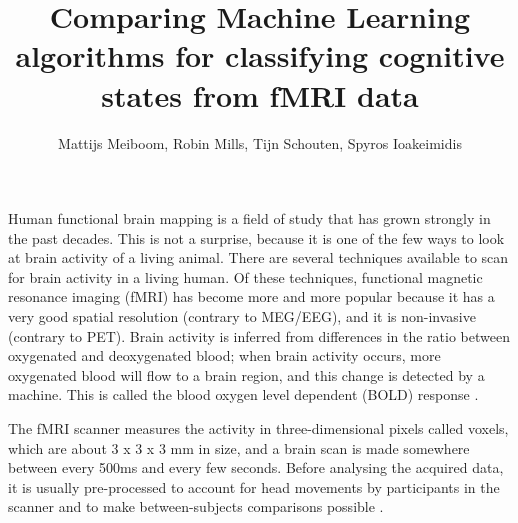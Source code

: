 \documentclass[preprint,journal,11pt]{vgtc}
\title{Comparing Machine Learning algorithms for classifying cognitive states from fMRI data}
\author{Mattijs Meiboom, Robin Mills, Tijn Schouten, Spyros Ioakeimidis}
\begin{document}
\label{sec:introduction}
\maketitle
Human functional brain mapping is a field of study that has grown strongly in the past decades. This is not a surprise, because it is one of the few ways to look at brain activity of a living animal. There are several techniques available to scan for brain activity in a living human. Of these techniques, functional magnetic resonance imaging (fMRI) has become more and more popular because it has a very good spatial resolution (contrary to MEG/EEG), and it is non-invasive (contrary to PET). Brain activity is inferred from differences in the ratio between oxygenated and deoxygenated blood; when brain activity occurs, more oxygenated blood will flow to a brain region, and this change is detected by a machine. This is called the blood oxygen level dependent (BOLD) response \cite{sm:2012fMRI}.

The fMRI scanner measures the activity in three-dimensional pixels called voxels, which are about 3 x 3 x 3 mm in size, and a brain scan is made somewhere between every 500ms and every few seconds. Before analysing the acquired data, it is usually pre-processed to account for head movements by participants in the scanner and to make between-subjects comparisons possible \cite{sl:2009rl}.
\end{document}
